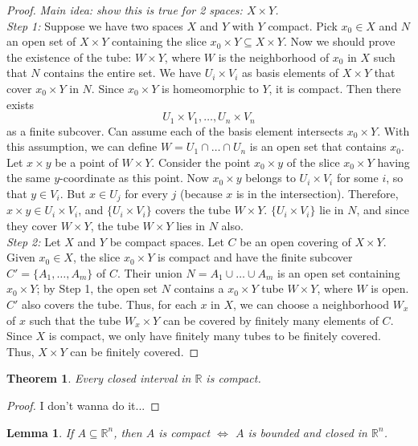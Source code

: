 \documentclass[article,11pt, reqno]{article}
\newtheorem*{theorem}{Theorem}
\newtheorem*{lemma}{Lemma}
\theoremstyle{remark}
\newcommand{\R}{\mathbb{R}}
\newcommand{\<}{\langle}
\renewcommand{\>}{\rangle}
\begin{document}
\begin{proof}
    \textit{Main idea: show this is true for 2 spaces: $X\times Y$.}\\
    \textit{Step 1:} Suppose we have two spaces $X$ and $Y$ with $Y$ compact. Pick $x_0\in X$ and $N$ an open set of $X\times Y$ containing the slice $x_0\times Y\subseteq X\times Y$. Now we should prove the existence of the tube: $W\times Y$, where $W$ is the neighborhood of $x_0$ in $X$ such that $N$ contains the entire set. We have $U_i\times V_i$ as basis elements of $X\times Y$ that cover $x_0\times Y$ in $N$. Since $x_0\times Y$ is homeomorphic to $Y$, it is compact. Then there exists
    $$
        U_1\times V_1,\dots,U_n\times V_n
    $$
    as a finite subcover. Can assume each of the basis element intersects $x_0\times Y$. With this assumption, we can define $W=U_1\cap\dots\cap U_n$ is an open set that contains $x_0$. Let $x\times y$ be a point of $W\times Y$. Consider the point $x_0\times y$ of the slice $x_0\times Y$ having the same $y$-coordinate as this point. Now $x_0\times y$ belongs to $U_i\times V_i$ for some $i$, so that $y\in V_i$. But $x\in U_j$ for every $j$ (because $x$ is in the intersection). Therefore, $x\times y \in U_i\times V_i$, and $\{U_i\times V_i\}$ covers the tube $W\times Y$. $\{U_i \times V_i\}$ lie in $N$, and since they cover $W\times Y$, the tube $W\times Y$ lies in $N$ also.\\
    \textit{Step 2:} Let $X$ and $Y$ be compact spaces. Let $C$ be an open covering of $X\times Y$. Given $x_0\in X$, the slice $x_0\times Y$ is compact and have the finite subcover $C'=\{A_1,\dots, A_m\}$ of $C$. Their union $N = A_1 \cup\dots\cup A_m$ is an open set containing $x_0\times Y$; by Step 1, the open set $N$ contains a $x_0\times Y$ tube $W\times Y$, where $W$ is open. $C'$ also covers the tube. Thus, for each $x$ in $X$, we can choose a neighborhood $W_x$ of $x$ such that the tube $W_x\times Y$ can be covered by finitely many elements of $C$. Since $X$ is compact, we only have finitely many tubes to be finitely covered. Thus, $X\times Y$ can be finitely covered.
\end{proof}
\begin{theorem}
    Every closed interval in $\R$ is compact.
\end{theorem}
\begin{proof}
    I don't wanna do it...
\end{proof}
\begin{lemma}
    If $A\subseteq\mathbb{R}^n$, then $A$ is compact $\iff$ $A$ is bounded and closed in $\mathbb{R}^n$.
\end{lemma}
\end{document}
